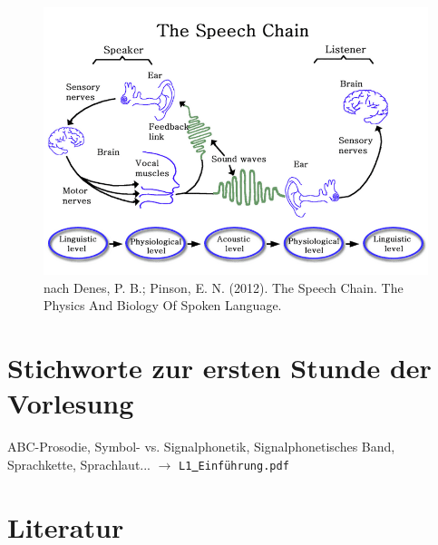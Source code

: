 \documentclass[11pt]{book}
\begin{document}
\begin{figure}[htbp]
\begin{center}
\includegraphics[width=\textwidth]{grafiken/allgemeine-einfuehrung/speech-chain}
\caption{nach Denes, P. B.; Pinson, E. N. (2012). The Speech Chain. The Physics And Biology Of Spoken Language.}
\label{fig1}
\end{center}
\end{figure}

\section{Stichworte zur ersten Stunde der Vorlesung} 

ABC-Prosodie,  Symbol- vs. Signalphonetik, Signalphonetisches Band, Sprachkette, Sprachlaut... $\rightarrow$ {\tt L1\underline{\ }Einführung.pdf} 


\section{Literatur}
\end{document}

